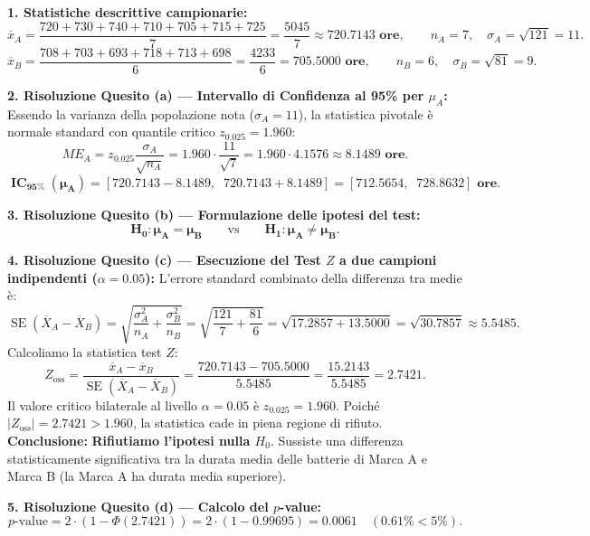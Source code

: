 \documentclass[11pt,a4paper]{article}
\begin{document}
\begin{soluzionebox}
\textbf{1. Statistiche descrittive campionarie:}
\[
\overline{x}_A = \frac{720 + 730 + 740 + 710 + 705 + 715 + 725}{7} = \frac{5045}{7} \approx \mathbf{720.7143\text{ ore}}, \qquad n_A = 7, \quad \sigma_A = \sqrt{121} = 11.
\]
\[
\overline{x}_B = \frac{708 + 703 + 693 + 718 + 713 + 698}{6} = \frac{4233}{6} = \mathbf{705.5000\text{ ore}}, \qquad n_B = 6, \quad \sigma_B = \sqrt{81} = 9.
\]

\textbf{2. Risoluzione Quesito (a) --- Intervallo di Confidenza al 95\% per $\mu_A$:}
Essendo la varianza della popolazione nota ($\sigma_A = 11$), la statistica pivotale è normale standard con quantile critico $z_{0.025} = 1.960$:
\[
ME_A = z_{0.025} \frac{\sigma_A}{\sqrt{n_A}} = 1.960 \cdot \frac{11}{\sqrt{7}} = 1.960 \cdot 4.1576 \approx \mathbf{8.1489\text{ ore}}.
\]
\[
\mathbf{\operatorname{IC}_{95\%}(\mu_A) = [720.7143 - 8.1489, \;\; 720.7143 + 8.1489] = [712.5654, \;\; 728.8632]\text{ ore}}.
\]

\textbf{3. Risoluzione Quesito (b) --- Formulazione delle ipotesi del test:}
\[
\mathbf{H_0: \mu_A = \mu_B} \qquad \text{vs} \qquad \mathbf{H_1: \mu_A \neq \mu_B}.
\]

\textbf{4. Risoluzione Quesito (c) --- Esecuzione del Test $Z$ a due campioni indipendenti ($\alpha = 0.05$):}
L'errore standard combinato della differenza tra medie è:
\[
\operatorname{SE}(\overline{X}_A - \overline{X}_B) = \sqrt{\frac{\sigma_A^2}{n_A} + \frac{\sigma_B^2}{n_B}} = \sqrt{\frac{121}{7} + \frac{81}{6}} = \sqrt{17.2857 + 13.5000} = \sqrt{30.7857} \approx 5.5485.
\]
Calcoliamo la statistica test $Z$:
\[
Z_{\text{oss}} = \frac{\overline{x}_A - \overline{x}_B}{\operatorname{SE}(\overline{X}_A - \overline{X}_B)} = \frac{720.7143 - 705.5000}{5.5485} = \frac{15.2143}{5.5485} = \mathbf{2.7421}.
\]
Il valore critico bilaterale al livello $\alpha = 0.05$ è $z_{0.025} = 1.960$.
Poiché $|Z_{\text{oss}}| = 2.7421 > 1.960$, la statistica cade in piena regione di rifiuto.
\textbf{Conclusione:} \textbf{Rifiutiamo l'ipotesi nulla $H_0$}. Sussiste una differenza statisticamente significativa tra la durata media delle batterie di Marca A e Marca B (la Marca A ha durata media superiore).

\textbf{5. Risoluzione Quesito (d) --- Calcolo del $p$-value:}
\[
p\text{-value} = 2 \cdot (1 - \Phi(2.7421)) = 2 \cdot (1 - 0.99695) = \mathbf{0.0061} \quad (\mathbf{0.61\%} < 5\%).
\]
\end{soluzionebox}
\end{document}

